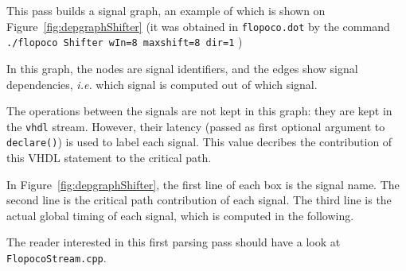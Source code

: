 \documentclass{article}
\begin{document}
This pass builds  a signal graph, an example of which is shown on Figure~\ref{fig:depgraphShifter} 
(it was obtained in \texttt{flopoco.dot} by the command
\verb!./flopoco Shifter wIn=8 maxshift=8 dir=1! )

In this graph, the nodes are signal identifiers, and the edges show signal dependencies, \emph{i.e.} which signal is computed out of which signal. 

The operations between the signals are not kept in this graph: they are kept in the \texttt{vhdl} stream.
  However, their latency (passed as first optional argument to  \texttt{declare()}) is used to label each signal.
  This value decribes the contribution of this VHDL statement to the critical path.

  In Figure~\ref{fig:depgraphShifter}, the first line of each box is the signal name.
The second line is the critical path contribution of each signal.
  The third line is the actual global timing of each signal, which is computed in the following. 
  
The reader interested in this first parsing pass should have a look at \texttt{FlopocoStream.cpp}.
\end{document}
